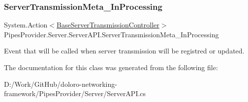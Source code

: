 \subsubsection{\texorpdfstring{Server\+Transmission\+Meta\+\_\+\+In\+Processing}{ServerTransmissionMeta\_InProcessing}}
{\footnotesize\ttfamily System.\+Action$<$\mbox{\hyperlink{class_pipes_provider_1_1_server_1_1_transmission_controllers_1_1_base_server_transmission_controller}{Base\+Server\+Transmission\+Controller}}$>$ Pipes\+Provider.\+Server.\+Server\+A\+P\+I.\+Server\+Transmission\+Meta\+\_\+\+In\+Processing\hspace{0.3cm}{\ttfamily [static]}}



Event that will be called when server transmission will be registred or updated. 



The documentation for this class was generated from the following file\+:\begin{DoxyCompactItemize}
\item 
D\+:/\+Work/\+Git\+Hub/doloro-\/networking-\/framework/\+Pipes\+Provider/\+Server/Server\+A\+P\+I.\+cs\end{DoxyCompactItemize}
